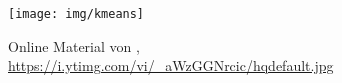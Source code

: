 \begin{frame}
    \frametitle{\insertsubsection}

    \begin{figure}[H]
        \centering
        \texttt{[image: img/kmeans]}
        \caption{Online Material von \cite{lavrenko2013}, \url{https://i.ytimg.com/vi/_aWzGGNrcic/hqdefault.jpg}\label{fig:kmeans}}
    \end{figure}
\end{frame}